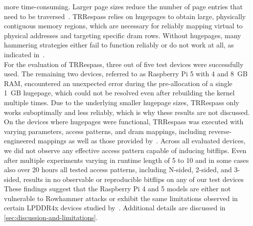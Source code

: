         more time-consuming. Larger page sizes reduce the number of page entries that need to be 
        traversed~\cite{webHugepagesDebian}. TRRespass relies on hugepages to obtain large, physically contiguous memory regions, 
        which are necessary for reliably mapping virtual to physical addresses and targeting specific \gls{dram} 
        rows. Without hugepages, many hammering strategies either fail to function reliably or do not work at 
        all, as indicated in~\cite{paperTRRespass}.
        \\
        For the evaluation of TRRespass, three out of five test devices were successfully used. The remaining 
        two devices, referred to as Raspberry Pi 5 with 4 and 8~GB RAM, encountered an unexpected error during the pre-allocation of a single 1~GB hugepage, which 
        could not be resolved even after rebuilding the kernel multiple times. Due to the underlying smaller 
        hugepage sizes, TRRespass only works suboptimally and less reliably, which is why these results are 
        not discussed. On the devices where hugepages were functional, TRRespass was executed with varying 
        parameters, access patterns, and \gls{dram} mappings, including reverse-engineered mappings as well as 
        those provided by~\cite{paperDRAMA, paperMemoryAware, paperDRAMMaUT}. 
        Across all evaluated devices, we did not observe any effective access pattern capable of inducing bitflips.
        Even after multiple experiments varying in runtime length of 5 to 10 and in some cases also over 20 hours 
        all tested access patterns, including N-sided, 2-sided, and 3-sided, results in no observable or reproducible 
        bitflips on any of our test devices
        \\
        These findings suggest that the Raspberry Pi 4 and 5 models 
        are either not vulnerable to Rowhammer attacks or exhibit the same limitations observed in certain 
        LPDDR4x devices studied by~\cite{paperBlacksmith}. Additional details are discussed in 
        \cref{sec:discussion-and-limitations}.
        